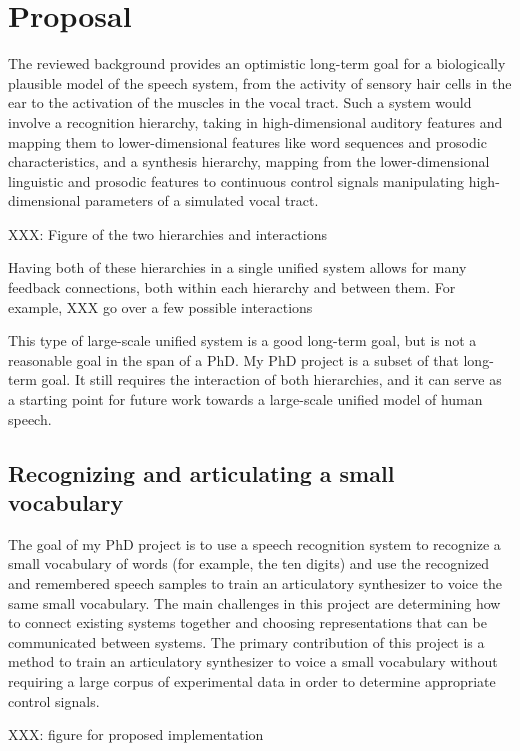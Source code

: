 \documentclass{article}
\begin{document}
\section{Proposal}
\label{sec:proposal}

The reviewed background
provides an optimistic long-term
goal for a biologically plausible
model of the speech system,
from the activity of sensory
hair cells in the ear
to the activation of
the muscles in the vocal tract.
Such a system would involve
a recognition hierarchy,
taking in high-dimensional auditory features
and mapping them to lower-dimensional
features like word sequences
and prosodic characteristics,
and a synthesis hierarchy,
mapping from the lower-dimensional
linguistic and prosodic features
to continuous control signals
manipulating high-dimensional parameters
of a simulated vocal tract.

XXX: Figure of the two hierarchies and interactions

Having both of these hierarchies
in a single unified system
allows for many feedback connections,
both within each hierarchy
and between them.
For example,
XXX go over a few possible interactions

This type of large-scale unified system
is a good long-term goal,
but is not a reasonable
goal in the span of a PhD.
My PhD project is a subset
of that long-term goal.
It still requires the interaction of both hierarchies,
and it can serve as a starting point
for future work towards a large-scale
unified model of human speech.

\subsection{Recognizing and articulating a small vocabulary}
\label{subsec:proposal}

The goal of my PhD project is to
use a speech recognition system
to recognize a small vocabulary of words
(for example, the ten digits)
and use the recognized and remembered
speech samples to train
an articulatory synthesizer
to voice the same small vocabulary.
The main challenges in this project
are determining how to connect
existing systems together
and choosing representations that
can be communicated between systems.
The primary contribution of this project
is a method to train an
articulatory synthesizer
to voice a small vocabulary
without requiring a large corpus
of experimental data
in order to determine appropriate control signals.

XXX: figure for proposed implementation
\end{document}
